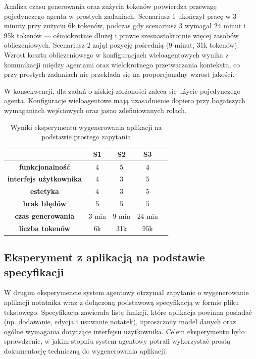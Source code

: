 Analiza czasu generowania oraz zużycia tokenów potwierdza przewagę pojedynczego agenta w prostych zadaniach. Scenariusz 1 ukończył pracę w 3 minuty przy zużyciu 6k tokenów, podczas gdy scenariusz 3 wymagał 24 minut i 95k tokenów — ośmiokrotnie dłużej i prawie szesnastokrotnie więcej zasobów obliczeniowych. Scenariusz 2 zajął pozycję pośrednią (9 minut, 31k tokenów). Wzrost kosztu obliczeniowego w konfiguracjach wieloagentowych wynika z komunikacji między agentami oraz wielokrotnego przetwarzania kontekstu, co przy prostych zadaniach nie przekłada się na proporcjonalny wzrost jakości.

W konsekwencji, dla zadań o niskiej złożoności zaleca się użycie pojedynczego agenta. Konfiguracje wieloagentowe mają uzasadnienie dopiero przy bogatszych wymaganiach wejściowych oraz jasno zdefiniowanych rolach.

\begin{table}[h!]
    \centering
    \begin{tabular}{|c|c|c|c|c|}
    \hline
    & \textbf{S1} & \textbf{S2} & \textbf{S3} \\
    \hline
    \textbf{funkcjonalność} & 4 & 5 & 4 \\
    \hline
    \textbf{interfejs użytkownika} & 4 & 3 & 5 \\
    \hline
    \textbf{estetyka} & 4 & 3 & 5 \\
    \hline
    \textbf{brak błędów} & 5 & 5 & 5 \\
    \hline
    \textbf{czas generowania} & 3 min & 9 min & 24 min \\
    \hline
    \textbf{liczba tokenów} & 6k & 31k & 95k \\
    \hline
    \end{tabular}
    \caption{Wyniki eksperymentu wygenerowania aplikacji na podstawie prostego zapytania}
    \label{table:eksperyment-proste-polecenie-utworzenia-aplikacji}
\end{table}

\subsection{Eksperyment z aplikacją na podstawie specyfikacji}
W drugim eksperymencie system agentowy otrzymał zapytanie o wygenerowanie aplikacji notatnika wraz z dołączoną podstawową specyfikacją w formie pliku tekstowego. Specyfikacja zawierała listę funkcji, które aplikacja powinna posiadać (np. dodawanie, edycja i usuwanie notatek), uproszczony model danych oraz ogólne wymagania dotyczące interfejsu użytkownika. Celem eksperymentu było sprawdzenie, w jakim stopniu system agentowy potrafi wykorzystać prostą dokumentację techniczną do wygenerowania aplikacji.

